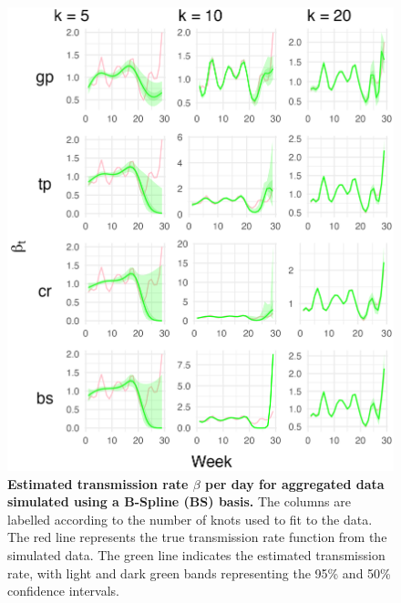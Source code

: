 \documentclass[
11pt, %
oneside, %
english, %
singlespacing, %
]{macthesis} %
\begin{document}
\begin{figure}[H]
\centering
\includegraphics[width=\textwidth]{figure/Simulated/aggregated/simulation_agg_bs_20_k(5,10,20)_bsd1_beta1_plot_beta.png}
\caption[Estimated Simulated and Aggregated Data (BS) Transmission Rate]{\textbf{Estimated transmission rate \(\beta\) per day for aggregated data simulated using a B-Spline (BS) basis.} The columns are labelled according to the number of knots used to fit to the data. The red line represents the true transmission rate function from the simulated data. The green line indicates the estimated transmission rate, with light and dark green bands representing the 95\% and 50\% confidence intervals.}
\label{fig:transmission_agg_bs}
\end{figure}
\end{document}
